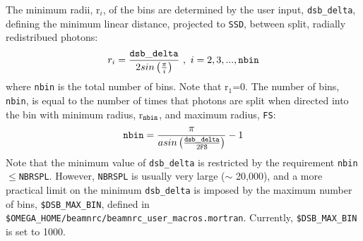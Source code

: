 \documentclass[12pt,twoside]{article}
\begin{document}
The minimum radii, r$_i$, of the bins are determined by the user input, {\tt dsb\_delta}, defining the minimum
linear distance, projected to {\tt SSD}, between split, radially redistribued photons:
\begin{equation}
r_i=\frac{\tt dsb\_delta}{2sin\left(\frac{\pi}{i}\right)}~,~ i=2,3,...,{\tt nbin}
\label{rieqn}
\end{equation}
where {\tt nbin} is the total number of bins.  Note that r$_1$=0.  The number of bins, {\tt nbin}, is equal
to the number of times that photons are split when directed into the bin with minimum radius, r$_{\tt nbin}$,
and maximum radius, {\tt FS}:
\begin{equation}
{\tt nbin}=\frac{\pi}{asin\left(\frac{\tt dsb\_delta}{2{\tt FS}}\right)}-1
\label{nbineqn}
\end{equation}
Note that the minimum value of {\tt dsb\_delta} is restricted by the requirement {\tt nbin}$\leq${\tt NBRSPL}.
However, {\tt NBRSPL} is usually very large ($\sim$ 20,000), and a more practical limit on the minimum
{\tt dsb\_delta} is imposed by the maximum number of bins, {\tt \$DSB\_MAX\_BIN}, defined in
{\tt \$OMEGA\_HOME/beamnrc/beamnrc\_user\_macros.mortran}.  Currently, {\tt \$DSB\_MAX\_BIN} is set to
1000.
\end{document}
